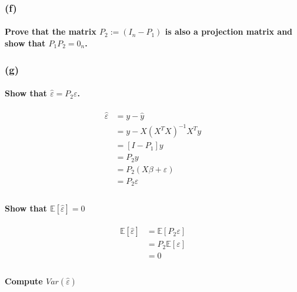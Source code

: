 \documentclass{article}
\newcommand{\E}{\mathbb{E}}
\begin{document}
\subsubsection{(f)}
\paragraph{Prove that the matrix $P_{2}:=\left(I_{n}-P_{1}\right)$ is also a projection matrix and show that $P_{1} P_{2}=0_{n}$.}

    \subsubsection{(g)}
    \paragraph{Show that $\hat{\varepsilon}=P_{2} \varepsilon$.}

    \begin{align*}
        \hat \varepsilon
         & = y - \hat y                             \\
         & = y - X \left(X^T X \right)^{-1} X^T y   \\
         & = \left[ I - P_1 \right] y               \\
         & = P_2 y                                  \\
         & = P_2 \left(X \beta + \varepsilon\right) \\
         & = P_2 \varepsilon                        \\
    \end{align*}


    \paragraph{Show that \(\E[\hat \varepsilon] = 0\)}

    \begin{align*}
        \E[\hat \varepsilon]
         & = \E \left[ P_2 \varepsilon \right] \\
         & = P_2 \E \left[ \varepsilon \right] \\
         & = 0                                 \\
    \end{align*}

    \paragraph{Compute \(Var(\hat \varepsilon)\)}
\end{document}
